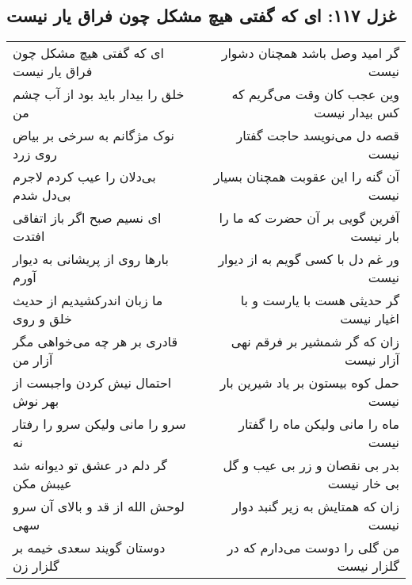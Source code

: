 \begin{center}
\section*{غزل ۱۱۷: ای که گفتی هیچ مشکل چون فراق یار نیست}
\label{sec:117}
\begin{longtable}{l p{0.5cm} r}
ای که گفتی هیچ مشکل چون فراق یار نیست
&&
گر امید وصل باشد همچنان دشوار نیست
\\
خلق را بیدار باید بود از آب چشم من
&&
وین عجب کان وقت می‌گریم که کس بیدار نیست
\\
نوک مژگانم به سرخی بر بیاض روی زرد
&&
قصه دل می‌نویسد حاجت گفتار نیست
\\
بی‌دلان را عیب کردم لاجرم بی‌دل شدم
&&
آن گنه را این عقوبت همچنان بسیار نیست
\\
ای نسیم صبح اگر باز اتفاقی افتدت
&&
آفرین گویی بر آن حضرت که ما را بار نیست
\\
بارها روی از پریشانی به دیوار آورم
&&
ور غم دل با کسی گویم به از دیوار نیست
\\
ما زبان اندرکشیدیم از حدیث خلق و روی
&&
گر حدیثی هست با یارست و با اغیار نیست
\\
قادری بر هر چه می‌خواهی مگر آزار من
&&
زان که گر شمشیر بر فرقم نهی آزار نیست
\\
احتمال نیش کردن واجبست از بهر نوش
&&
حمل کوه بیستون بر یاد شیرین بار نیست
\\
سرو را مانی ولیکن سرو را رفتار نه
&&
ماه را مانی ولیکن ماه را گفتار نیست
\\
گر دلم در عشق تو دیوانه شد عیبش مکن
&&
بدر بی نقصان و زر بی عیب و گل بی خار نیست
\\
لوحش الله از قد و بالای آن سرو سهی
&&
زان که همتایش به زیر گنبد دوار نیست
\\
دوستان گویند سعدی خیمه بر گلزار زن
&&
من گلی را دوست می‌دارم که در گلزار نیست
\\
\end{longtable}
\end{center}
